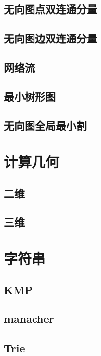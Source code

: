 \documentclass{article}
\begin{document}
\subsection{无向图点双连通分量}

\subsection{无向图边双连通分量}

\subsection{网络流}

\subsection{最小树形图}

\subsection{无向图全局最小割}

\section{计算几何}
\subsection{二维}

\subsection{三维}

\section{字符串}
\subsection{KMP}

\subsection{manacher}

\subsection{Trie}

\end{document}

